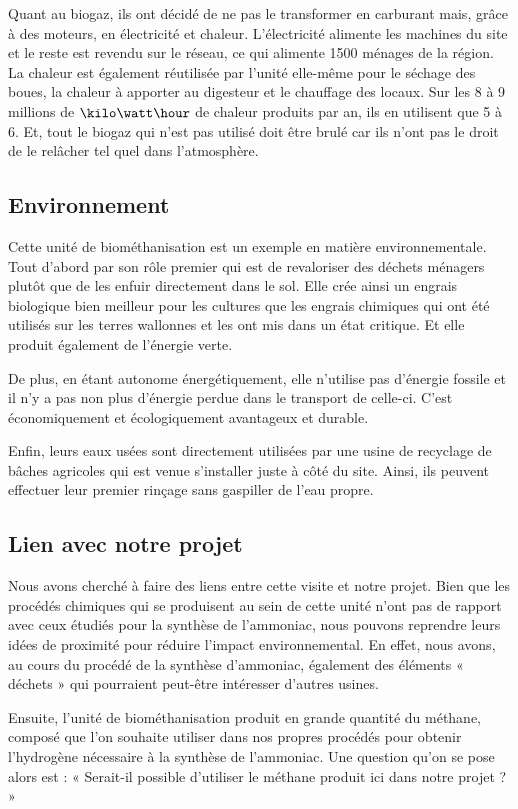 Quant au biogaz, ils ont décidé de ne pas le transformer en carburant mais, grâce à des moteurs, en électricité et chaleur. L'électricité alimente les machines du site et le reste est revendu sur le réseau, ce qui alimente 1500 ménages de la région. La chaleur est également réutilisée par l'unité elle-même pour le séchage des boues, la chaleur à apporter au digesteur et le chauffage des locaux. Sur les 8 à 9 millions de $\kilo\watt\hour$ de chaleur produits par an, ils en utilisent que 5 à 6. Et, tout le biogaz qui n'est pas utilisé doit être brulé car ils n'ont pas le droit de le relâcher tel quel dans l'atmosphère.

\subsection{Environnement}
Cette unité de biométhanisation est un exemple en matière environnementale.
Tout d'abord par son rôle premier qui est de revaloriser des déchets ménagers plutôt que de les enfuir directement dans le sol. Elle crée ainsi un engrais biologique bien meilleur pour les cultures que les engrais chimiques qui ont été utilisés sur les terres wallonnes et les ont mis dans un état critique. Et elle produit également de l'énergie verte.

De plus, en étant autonome énergétiquement, elle n'utilise pas d'énergie fossile et il n'y a pas non plus d'énergie perdue dans le transport de celle-ci. C'est économiquement et écologiquement avantageux et durable.

Enfin, leurs eaux usées sont directement utilisées par une usine de recyclage de bâches agricoles qui est venue s'installer juste à côté du site. Ainsi, ils peuvent effectuer leur premier rinçage sans gaspiller de l'eau propre.

\subsection{Lien avec notre projet}
Nous avons cherché à faire des liens entre cette visite et notre projet. Bien que les procédés chimiques qui se produisent au sein de cette unité n'ont pas de rapport avec ceux étudiés pour la synthèse de l'ammoniac, nous pouvons reprendre leurs idées de proximité pour réduire l'impact environnemental. En effet, nous avons, au cours du procédé de la synthèse d'ammoniac, également des éléments « déchets » qui pourraient peut-être intéresser d'autres usines.


Ensuite, l'unité de biométhanisation produit en grande quantité du méthane, composé que l'on souhaite utiliser dans nos propres procédés pour obtenir l'hydrogène nécessaire à la synthèse de l'ammoniac. Une question qu'on se pose alors est : « Serait-il possible d'utiliser le méthane produit ici dans notre projet ? »


